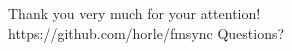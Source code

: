 \documentclass[xcolor=x11names, aspectratio=169,usenames,dvipsnames]{beamer}
\begin{document}
\begin{frame}
\vfill
\begin{center}\Large
Thank you very much for your attention!\\\bigskip
https://github.com/horle/fmsync
Questions?
\end{center}\vfill
\end{frame}

\maketitle
\end{document}
